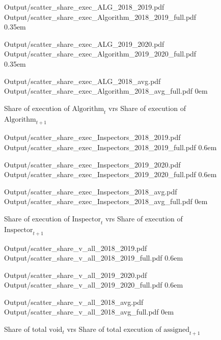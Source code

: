 \documentclass{article}
\newcommand{\OutPath}{Output/}%
\newcommand{\OutPath}{../Output/}%
\begin{document}
\begin{figure}[H]
    \centering
    \caption{Share of execution of $\text{Algorithm}_t$ vrs Share of execution of $\text{Algorithm}_{t+1}$}

      {\OutPath scatter_share_exec_ALG_2018_2019.pdf}
      {\OutPath scatter_share_exec_Algorithm_2018_2019_full.pdf}
      {0.35em}

      {\OutPath scatter_share_exec_ALG_2019_2020.pdf}
      {\OutPath scatter_share_exec_Algorithm_2019_2020_full.pdf}
      {0.35em}

      {\OutPath scatter_share_exec_ALG_2018_avg.pdf}
      {\OutPath scatter_share_exec_Algorithm_2018_avg_full.pdf}
      {0em}
\end{figure}

\begin{figure}[H]
    \centering
    \caption{Share of execution of $\text{Inspector}_t$ vrs Share of execution of $\text{Inspector}_{t+1}$}

      {\OutPath scatter_share_exec_Inspectors_2018_2019.pdf}
      {\OutPath scatter_share_exec_Inspectors_2018_2019_full.pdf}
      {0.6em}

      {\OutPath scatter_share_exec_Inspectors_2019_2020.pdf}
      {\OutPath scatter_share_exec_Inspectors_2019_2020_full.pdf}
      {0.6em}

      {\OutPath scatter_share_exec_Inspectors_2018_avg.pdf}
      {\OutPath scatter_share_exec_Inspectors_2018_avg_full.pdf}
      {0em}
\end{figure}


\begin{figure}[H]
    \centering
    \caption{Share of total $\text{void}_t$ vrs Share of total execution of $\text{assigned}_{t+1}$}

      {\OutPath scatter_share_v_all_2018_2019.pdf}
      {\OutPath scatter_share_v_all_2018_2019_full.pdf}
      {0.6em}

      {\OutPath scatter_share_v_all_2019_2020.pdf}
      {\OutPath scatter_share_v_all_2019_2020_full.pdf}
      {0.6em}

      {\OutPath scatter_share_v_all_2018_avg.pdf}
      {\OutPath scatter_share_v_all_2018_avg_full.pdf}
      {0em}
\end{figure}
\end{document}
